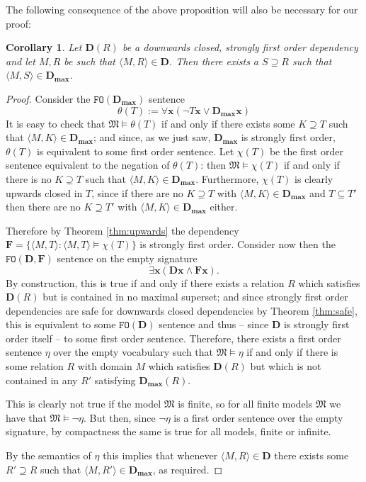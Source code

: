 \documentclass{article}
\newtheorem{Corollary}[Theorem]{Corollary}
\theoremstyle{definition}
\newcommand{\tuple}{\mathbf}
\newcommand{\FO}{\texttt{FO}}
\newcommand{\M}{\mathfrak M}
\newcommand{\D}{\mathbf D}
\newcommand{\F}{\mathbf F}
\newcommand{\Dmax}{\mathbf D_{\textbf{max}}}
\begin{document}
The following consequence of the above proposition will also be necessary for our proof:
\begin{Corollary}
	Let $\D(R)$ be a downwards closed, strongly first order dependency and let $M, R$ be such that $\langle M, R\rangle \in \D$. Then there exists a $S \supseteq R$ such that $\langle M, S\rangle \in \Dmax$.
	\label{coro:maximal}
\end{Corollary}
\begin{proof}
	Consider the $\FO(\Dmax)$ sentence 
	\[
		\theta(T) := \forall \tuple x(\lnot T \tuple x \vee \Dmax \tuple x)
	\]
	It is easy to check that $\M \models \theta(T)$ if and only if there exists some $K \supseteq T$ such that $\langle M, K\rangle \in \Dmax$; and since, as we just saw, $\Dmax$ is strongly first order, $\theta(T)$ is equivalent to some first order sentence. Let $\chi(T)$ be the first order sentence equivalent to the negation of $\theta(T)$: then $\M \models \chi(T)$ if and only if there is no $K \supseteq T$ such that $\langle M, K\rangle \in \Dmax$. Furthermore, $\chi(T)$ is clearly upwards closed in $T$, since if there are no $K \supseteq T$ with $\langle M, K \rangle \in \Dmax$ and $T \subseteq T'$ then there are no $K \supseteq T'$ with $\langle M, K\rangle \in \Dmax$ either. 

	Therefore by Theorem \ref{thm:upwards} the dependency $\F = \{\langle M, T\rangle : \langle M, T\rangle \models \chi(T)\}$ is strongly first order. Consider now then the $\FO(\D, \F)$ sentence on the empty signature
	\[
		\exists \tuple x (\D \tuple x \wedge \F\tuple x).
	\]
	By construction, this is true if and only if there exists a relation $R$ which satisfies $\D(R)$ but is contained in no maximal superset; and since strongly first order dependencies are safe for downwards closed dependencies by Theorem \ref{thm:safe}, this is equivalent to some $\FO(\D)$ sentence and thus -- since $\D$ is strongly first order itself -- to some first order sentence. Therefore, there exists a first order sentence $\eta$ over the empty vocabulary such that $\M \models \eta$ if and only if there is some relation $R$ with domain $M$ which satisfies $\D(R)$ but which is not contained in any $R'$ satisfying $\Dmax(R)$. 

	This is clearly not true if the model $\M$ is finite, so for all finite models $\M$ we have that $\M \models \lnot \eta$. But then, since $\lnot \eta$ is a first order sentence over the empty signature, by compactness the same is true for all models, finite or infinite. 

	By the semantics of $\eta$ this implies that whenever $\langle M, R\rangle \in \D$ there exists some $R' \supseteq R$ such that $\langle M, R'\rangle \in \Dmax$, as required.
\end{proof}
\end{document}
